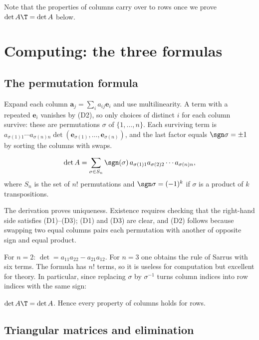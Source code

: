 Note that the properties of columns carry over to rows once we prove $\det A\T=\det A$ below.

\section{Computing: the three formulas}

\subsection*{The permutation formula}

Expand each column $\mathbf{a}_j=\sum_i a_{ij}\mathbf{e}_i$ and use multilinearity. A term with a repeated $\mathbf{e}_i$ vanishes by (D2), so only choices of distinct $i$ for each column survive: these are permutations $\sigma$ of $\{1,\dots,n\}$. Each surviving term is $a_{\sigma(1)1}\cdots a_{\sigma(n)n}\det(\mathbf{e}_{\sigma(1)},\dots,\mathbf{e}_{\sigma(n)})$, and the last factor equals $\sgn\sigma=\pm1$ by sorting the columns with swaps.

\begin{theorem}\label{thm:leibniz}
\[ \det A=\sum_{\sigma\in S_n}\sgn(\sigma)\,a_{\sigma(1)1}a_{\sigma(2)2}\cdots a_{\sigma(n)n}, \]
where $S_n$ is the set of $n!$ permutations and $\sgn\sigma=(-1)^{k}$ if $\sigma$ is a product of $k$ transpositions.
\end{theorem}

The derivation proves uniqueness. Existence requires checking that the right-hand side satisfies (D1)--(D3); (D1) and (D3) are clear, and (D2) follows because swapping two equal columns pairs each permutation with another of opposite sign and equal product.

For $n=2$: $\det=a_{11}a_{22}-a_{21}a_{12}$. For $n=3$ one obtains the rule of Sarrus with six terms. The formula has $n!$ terms, so it is useless for computation but excellent for theory. In particular, since replacing $\sigma$ by $\sigma^{-1}$ turns column indices into row indices with the same sign:

\begin{corollary}\label{cor:dettrans}
$\det A\T=\det A$. Hence every property of columns holds for rows.
\end{corollary}

\subsection*{Triangular matrices and elimination}

